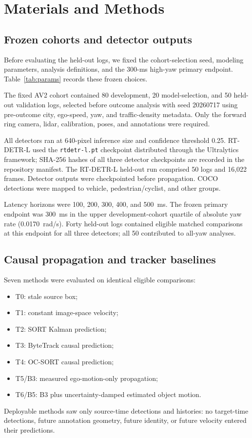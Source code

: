 \documentclass[journal]{IEEEtran}
\begin{document}
\section{Materials and Methods}
\subsection{Frozen cohorts and detector outputs}

Before evaluating the held-out logs, we fixed the cohort-selection seed, modeling parameters, analysis definitions, and the 300-ms high-yaw primary endpoint. Table~\ref{tab:params} records these frozen choices.

The fixed AV2 cohort contained 80 development, 20 model-selection, and 50 held-out validation logs, selected before outcome analysis with seed 20260717 using pre-outcome city, ego-speed, yaw, and traffic-density metadata. Only the forward ring camera, lidar, calibration, poses, and annotations were required.

All detectors ran at 640-pixel inference size and confidence threshold 0.25. RT-DETR-L used the \texttt{rtdetr-l.pt} checkpoint distributed through the Ultralytics framework; SHA-256 hashes of all three detector checkpoints are recorded in the repository manifest. The RT-DETR-L held-out run comprised 50 logs and 16,022 frames. Detector outputs were checkpointed before propagation. COCO detections were mapped to vehicle, pedestrian/cyclist, and other groups.

Latency horizons were 100, 200, 300, 400, and 500~ms. The frozen primary endpoint was 300~ms in the upper development-cohort quartile of absolute yaw rate (0.0170~rad/s). Forty held-out logs contained eligible matched comparisons at this endpoint for all three detectors; all 50 contributed to all-yaw analyses.

\subsection{Causal propagation and tracker baselines}
Seven methods were evaluated on identical eligible comparisons:
\begin{itemize}
\item T0: stale source box;
\item T1: constant image-space velocity;
\item T2: SORT Kalman prediction;
\item T3: ByteTrack causal prediction;
\item T4: OC-SORT causal prediction;
\item T5/B3: measured ego-motion-only propagation;
\item T6/B5: B3 plus uncertainty-damped estimated object motion.
\end{itemize}
Deployable methods saw only source-time detections and histories: no target-time detections, future annotation geometry, future identity, or future velocity entered their predictions.
\end{document}
